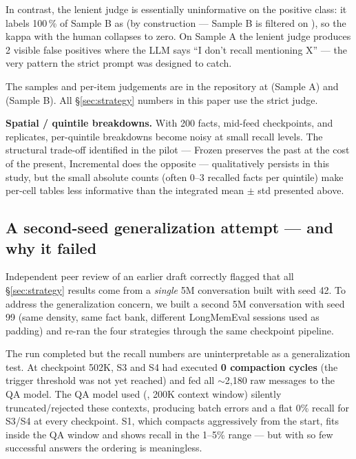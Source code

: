 In contrast, the lenient judge is essentially uninformative on the
positive class: it labels 100\,\% of Sample B as  (by
construction --- Sample B is filtered on ), so
the kappa with the human collapses to zero. On Sample A the lenient
judge produces 2 visible false positives where the LLM says ``I don't
recall mentioning X'' --- the very pattern the strict prompt was designed
to catch.

The samples and per-item judgements are in the repository at
 (Sample A) and 
(Sample B). All \S\ref{sec:strategy} numbers in this paper use the strict judge.

\textbf{Spatial / quintile breakdowns.} With 200 facts, mid-feed checkpoints,
and replicates, per-quintile breakdowns become noisy at small recall
levels. The structural trade-off identified in the pilot --- Frozen
preserves the past at the cost of the present, Incremental does the
opposite --- qualitatively persists in this study, but the small absolute
counts (often 0--3 recalled facts per quintile) make per-cell tables
less informative than the integrated mean $\pm$ std presented above.

\subsection{A second-seed generalization attempt --- and why it failed}
\label{sec:seed99}

Independent peer review of an earlier draft correctly flagged that all \S\ref{sec:strategy}
results come from a \textit{single} 5M conversation built with seed 42. To
address the generalization concern, we built a second 5M conversation
with seed 99 (same density, same fact bank, different LongMemEval
sessions used as padding) and re-ran the four strategies through the
same checkpoint pipeline.

The run completed but the recall numbers are uninterpretable as a
generalization test. At checkpoint 502K, S3 and S4 had executed \textbf{0
compaction cycles} (the trigger threshold was not yet reached) and
fed all $\sim$2{,}180 raw messages to the QA model. The QA model used
(, 200K context window) silently
truncated/rejected these contexts, producing batch errors and a
flat 0\% recall for S3/S4 at every checkpoint. S1, which compacts
aggressively from the start, fits inside the QA window and shows
recall in the 1--5\% range --- but with so few successful answers the
ordering is meaningless.

